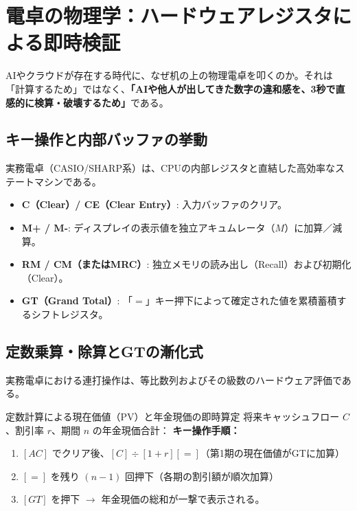 \ifja
\chapter{電卓の物理学：ハードウェアレジスタによる即時検証}
\label{chap:calculator_physics}

AIやクラウドが存在する時代に、なぜ机の上の物理電卓を叩くのか。それは「計算するため」ではなく、\textbf{「AIや他人が出してきた数字の違和感を、3秒で直感的に検算・破壊するため」}である。

\section{キー操作と内部バッファの挙動}
実務電卓（CASIO/SHARP系）は、CPUの内部レジスタと直結した高効率なステートマシンである。
\begin{itemize}
    \item \textbf{C（Clear）/ CE（Clear Entry）}: 入力バッファのクリア。
    \item \textbf{M+ / M-}: ディスプレイの表示値を独立アキュムレータ（$M$）に加算／減算。
    \item \textbf{RM / CM（またはMRC）}: 独立メモリの読み出し（Recall）および初期化（Clear）。
    \item \textbf{GT（Grand Total）}: 「$=$」キー押下によって確定された値を累積蓄積するシフトレジスタ。
\end{itemize}

\section{定数乗算・除算とGTの漸化式}
実務電卓における連打操作は、等比数列およびその級数のハードウェア評価である。



\begin{calcbox}{定数計算による現在価値（PV）と年金現価の即時算定}
将来キャッシュフロー $C$、割引率 $r$、期間 $n$ の年金現価合計：
\textbf{キー操作手順：}
\begin{enumerate}
    \item $[AC]$ でクリア後、$[C] \div [1 + r] [=]$（第1期の現在価値がGTに加算）
    \item $[=]$ を残り $(n-1)$ 回押下（各期の割引額が順次加算）
    \item $[GT]$ を押下 $\to$ 年金現価の総和が一撃で表示される。
\end{enumerate}
\end{calcbox}

